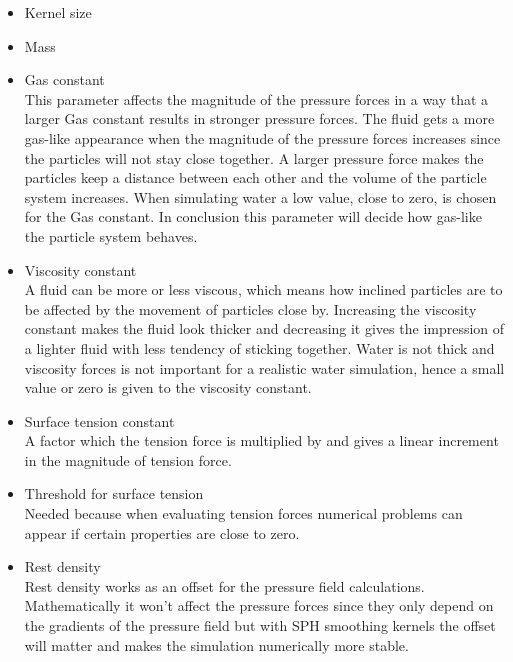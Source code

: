 \documentclass[paper=a4, fontsize=11pt]{report}
\numberwithin{equation}{section} %
\numberwithin{figure}{section} %
\numberwithin{table}{section} %
\begin{document}
\begin{itemize}
    \item Kernel size
    
    \item Mass
    \\%
    
    \item Gas constant
    \\This parameter affects the magnitude of the pressure forces in a way that a larger Gas constant results in stronger pressure forces. The fluid gets a more gas-like appearance when the magnitude of the pressure forces increases since the particles will not stay close together. A larger pressure force makes the particles keep a distance between each other and the volume of the particle system increases. When simulating water a low value, close to zero, is chosen for the Gas constant. In conclusion this parameter will decide how gas-like the particle system behaves.
    
    \item Viscosity constant
    \\A fluid can be more or less viscous, which means how inclined particles are to be affected by the movement of particles close by. Increasing the viscosity constant makes the fluid look thicker and decreasing it gives the impression of a lighter fluid with less tendency of sticking together. Water is not thick and viscosity forces is not important for a realistic water simulation, hence a small value or zero is given to the viscosity constant.
    
    \item Surface tension constant
    \\A factor which the tension force is multiplied by and gives a linear increment in the magnitude of tension force.
    
    \item Threshold for surface tension
    \\Needed because when evaluating tension forces numerical problems can appear if certain properties are close to zero.
    
    \item Rest density
    \\Rest density works as an offset for the pressure field calculations. Mathematically it won't affect the pressure forces since they only depend on the gradients of the pressure field but with SPH smoothing kernels the offset will matter and makes the simulation numerically more stable.
    
\end{itemize}
\end{document}
